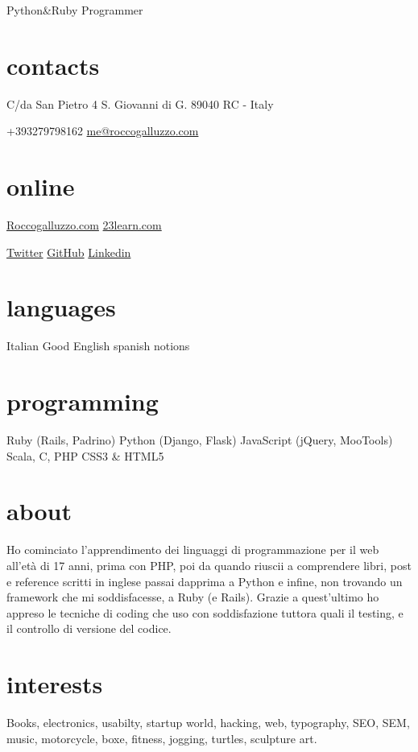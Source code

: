 \documentclass[print]{cv}
\begin{document}
       {Python\&Ruby Programmer}

\begin{aside}%
\section{contacts}
    C/da San Pietro 4
    S. Giovanni di G. 
89040 RC - Italy\par\smallskip%
+393279798162
	\href{mailto:me@roccogalluzzo.com}{me@roccogalluzzo.com}
	\section{online}
	\href{http://roccogalluzzo.com}{Roccogalluzzo.com}
           \href{http://23learn.com}{23learn.com}\par\smallskip%
	\href{http://twitter.com/byterussian}{Twitter}
           \href{https://github.com/byterussian}{GitHub}
           \href{http://www.linkedin.com/in/roccogalluzzo}{Linkedin}
  \section{languages}
    Italian
    Good English 
    spanish notions
  \section{programming}
    Ruby
    (Rails, Padrino)
    Python
    (Django, Flask)
    JavaScript
    (jQuery, MooTools)
    Scala, C, PHP
    CSS3 \& HTML5
\end{aside}

\section{about}
Ho cominciato l'apprendimento dei linguaggi di programmazione per il web all'età di 17 anni, 
prima con PHP, poi da quando riuscii a comprendere libri, post e reference scritti in inglese
 passai dapprima a Python e infine, non trovando un framework che mi soddisfacesse, a Ruby (e Rails). 
 Grazie a quest'ultimo ho appreso le tecniche di coding che uso con soddisfazione tuttora
 quali il testing, e il controllo di versione del codice.

\section{interests}

Books, electronics, usabilty, startup world, hacking, web, typography, SEO, SEM, music, motorcycle, boxe, fitness, jogging,
turtles, sculpture art.
\end{document}
